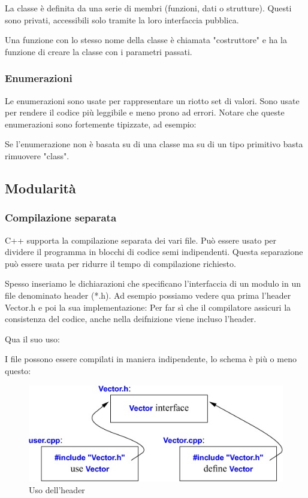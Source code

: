 \documentclass[11pt,a4paper]{book}
\begin{document}
La classe è definita da una serie di membri (funzioni, dati o strutture). Questi sono privati, accessibili solo tramite la loro interfaccia pubblica.
\label{code: 015}

Una funzione con lo stesso nome della classe è chiamata "costruttore" e ha la funzione di creare la classe con i parametri passati.

\subsubsection{Enumerazioni}
\label{code: 016}
Le enumerazioni sono usate per rappresentare un riotto set di valori. Sono usate per rendere il codice più leggibile e meno prono ad errori. Notare che queste enumerazioni sono fortemente tipizzate, ad esempio:
\label{code: 017}

Se l'enumerazione non è basata su di una classe ma su di un tipo primitivo basta rimuovere "class".

\subsection{Modularità}
\subsubsection{Compilazione separata}
C++ supporta la compilazione separata dei vari file. Può essere usato per dividere il programma in blocchi di codice semi indipendenti. Questa separazione può essere usata per ridurre il tempo di compilazione richiesto.

Spesso inseriamo le dichiarazioni che specificano l'interfaccia di un modulo in un file denominato header (*.h). Ad esempio possiamo vedere qua prima l'header Vector.h e poi la sua implementazione:
\label{code: 018}
Per far sì che il compilatore assicuri la consistenza del codice, anche nella deifnizione viene incluso l'header.

Qua il suo uso:
\label{code: 019}

I file possono essere compilati in maniera indipendente, lo schema è più o meno questo:
\begin{figure}[h!]
	\begin{center}
		\includegraphics[scale=0.6]{img/003.jpg}
		\caption{Uso dell'header}
		\label{fig: 003}
	\end{center}
\end{figure}
\end{document}
